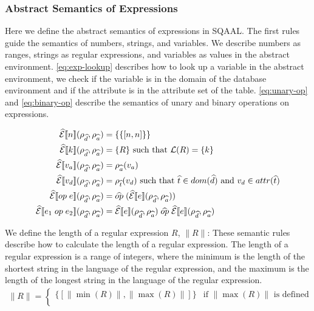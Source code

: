 \subsubsection{Abstract Semantics of Expressions}

Here we define the abstract semantics of expressions in SQAAL.
The first rules guide the semantics of numbers, strings, and variables.
We describe numbers as ranges, strings as regular expressions, and variables as values in the abstract environment.
\autoref{eq:exp-lookup} describes how to look up a variable in the abstract environment, we check if the variable is in the domain of the database environment and if the attribute is in the attribute set of the table.
\autoref{eq:unary-op} and \autoref{eq:binary-op} describe the semantics of unary and binary operations on expressions.

\begin{align}
    \absexpsem{n}(\rho_{\ab{d}}, \rho_{\ab{a}}) &= \{ \{ [n, n] \} \}\\
    \absexpsem{k}(\rho_{\ab{d}}, \rho_{\ab{a}}) &= \{ R \} \text{ such that }\mathcal{L}(R) = \{ k \} \\
    \absexpsem{v_a}(\rho_{\ab{d}}, \rho_{\ab{a}}) &=  \rho_{\ab{a}}(v_a) \\
    \absexpsem{v_d}(\rho_{\ab{d}}, \rho_{\ab{a}}) &=  \rho_{\ab{t}}(v_d) \text{ such that } \ab{t} \in dom(\ab{d}) \text{ and } v_d \in attr(\ab{t}) \\ \label{eq:exp-lookup}
    \absexpsem{op \; e}(\rho_{\ab{d}}, \rho_{\ab{a}}) &= \ab{op} \; (\absexpsem{e}(\rho_{\ab{d}}, \rho_{\ab{a}})) \\ \label{eq:unary-op}
    \absexpsem{e_1 \; op \; e_2}(\rho_{\ab{d}}, \rho_{\ab{a}}) &= \absexpsem{e}(\rho_{\ab{d}}, \rho_{\ab{a}}) \;\ab{op}\; \absexpsem{e}(\rho_{\ab{d}}, \rho_{\ab{a}})\\ \label{eq:binary-op}
\end{align}

We define the length of a regular expression $R$, $\|R\|$:
These semantic rules describe how to calculate the length of a regular expression.
The length of a regular expression is a range of integers, where the minimum is the length of the shortest string in the language of the regular expression, and the maximum is the length of the longest string in the language of the regular expression.
\begin{align}
    \|R\| = \begin{cases}
        \{ [\|\min(R)\|, \|\max(R)\|] \} & \text{if $\|\max(R)\|$ is defined} \\
    \end{cases}
\end{align}

